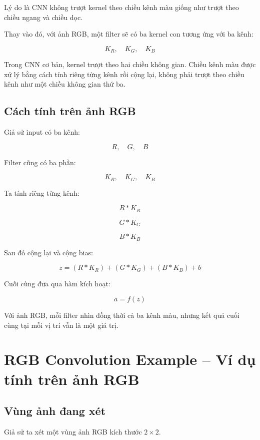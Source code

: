 Lý do là CNN không trượt kernel theo chiều kênh màu giống như trượt theo chiều ngang và chiều dọc.

Thay vào đó, với ảnh RGB, một filter sẽ có ba kernel con tương ứng với ba kênh:

\[
    K_R,\quad K_G,\quad K_B
\]

\begin{luuy}
Trong CNN cơ bản, kernel trượt theo hai chiều không gian. Chiều kênh màu được xử lý bằng cách tính riêng từng kênh rồi cộng lại, không phải trượt theo chiều kênh như một chiều không gian thứ ba.
\end{luuy}

\subsection{Cách tính trên ảnh RGB}

Giả sử input có ba kênh:

\[
    R,\quad G,\quad B
\]

Filter cũng có ba phần:

\[
    K_R,\quad K_G,\quad K_B
\]

Ta tính riêng từng kênh:

\[
    R*K_R
\]

\[
    G*K_G
\]

\[
    B*K_B
\]

Sau đó cộng lại và cộng bias:

\[
    z
    =
    (R*K_R)
    +
    (G*K_G)
    +
    (B*K_B)
    +
    b
\]

Cuối cùng đưa qua hàm kích hoạt:

\[
    a=f(z)
\]

\begin{ghinho}
Với ảnh RGB, mỗi filter nhìn đồng thời cả ba kênh màu, nhưng kết quả cuối cùng tại mỗi vị trí vẫn là một giá trị.
\end{ghinho}

\section{RGB Convolution Example -- Ví dụ tính trên ảnh RGB}

\subsection{Vùng ảnh đang xét}

Giả sử ta xét một vùng ảnh RGB kích thước $2\times2$.

